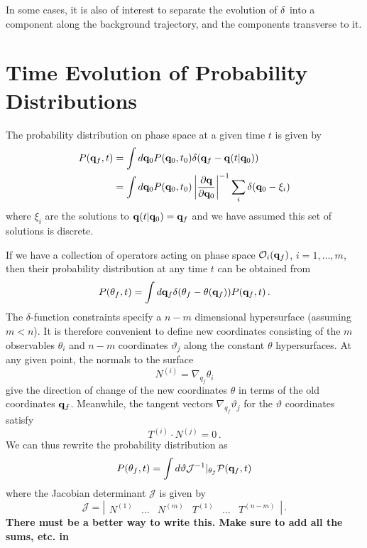 \documentclass{article}
\begin{document}
In some cases, it is also of interest to separate the evolution of ${\bf \delta}$ into a component along the background trajectory, and the components transverse to it.

\section{Time Evolution of Probability Distributions}
The probability distribution on phase space at a given time $t$ is given by
\begin{align}
  P({\bf q}_f,t) &= \int d{\bf q}_0 P({\bf q}_0,t_0)\delta({\bf q}_f-{\bf q}(t|{\bf q}_0)) \\
                 &= \int d{\bf q}_0 P({\bf q}_0,t_0)\left|\frac{\partial{\bf q}}{\partial{\bf q}_0}\right|^{-1}\sum_i \delta({\bf q}_0-\xi_i)
\end{align}
where $\xi_i$ are the solutions to ${\bf q}(t|{\bf q}_0) = {\bf q}_f$ and we have assumed this set of solutions is discrete.

If we have a collection of operators acting on phase space $\mathcal{O}_i({\bf q}_f)$, $i=1,\dots,m$, then their probability distribution at any time $t$ can be obtained from
\begin{equation}
  P({\bf \theta}_f,t) = \int d{\bf q}_f\delta({\bf \theta}_f - {\bf \theta}({\bf q}_f))P({\bf q}_f,t) \, .
\end{equation}
The $\delta$-function constraints specify a $n-m$ dimensional hypersurface (assuming $m < n$).
It is therefore convenient to define new coordinates consisting of the $m$ observables $\theta_i$ and $n-m$ coordinates $\vartheta_j$ along the constant $\theta$ hypersurfaces.
At any given point, the normals to the surface
\begin{equation}
  N^{(i)} = \nabla_{q_f}\theta_i
\end{equation}
give the direction of change of the new coordinates $\theta$ in terms of the old coordinates ${\bf q}_f$.
Meanwhile, the tangent vectors $\nabla_{q_f}\vartheta_j$ for the $\vartheta$ coordinates satisfy
\begin{equation}
  T^{(i)}\cdot N^{(j)} = 0 \, .
\end{equation}
We can thus rewrite the probability distribution as
\begin{equation}
  P(\theta_f,t) = \int d\vartheta \mathcal{J}^{-1}|_{\theta_f}\mathcal{P}({\bf q}_f,t)
\end{equation}
where the Jacobian determinant $\mathcal{J}$ is given by
\begin{equation}
  \mathcal{J} = \left|\begin{array}{cccccc}N^{(1)} & \dots & N^{(m)} & T^{(1)} & \dots & T^{(n-m)}\end{array}\right| \, .
\end{equation}
{\bf There must be a better way to write this.  Make sure to add all the sums, etc. in}
\end{document}
